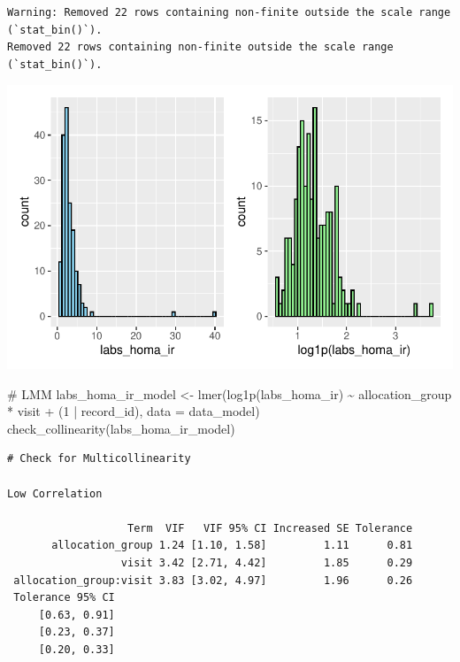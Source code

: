 \documentclass[
  letterpaper,
  DIV=11,
  numbers=noendperiod]{scrartcl}
\newenvironment{Shaded}{\begin{snugshade}}{\end{snugshade}}
\newcommand{\AttributeTok}[1]{\textcolor[rgb]{0.40,0.45,0.13}{#1}}
\newcommand{\CommentTok}[1]{\textcolor[rgb]{0.37,0.37,0.37}{#1}}
\newcommand{\DecValTok}[1]{\textcolor[rgb]{0.68,0.00,0.00}{#1}}
\newcommand{\FunctionTok}[1]{\textcolor[rgb]{0.28,0.35,0.67}{#1}}
\newcommand{\NormalTok}[1]{\textcolor[rgb]{0.00,0.23,0.31}{#1}}
\newcommand{\OtherTok}[1]{\textcolor[rgb]{0.00,0.23,0.31}{#1}}
\newcommand{\SpecialCharTok}[1]{\textcolor[rgb]{0.37,0.37,0.37}{#1}}
\begin{document}
\begin{verbatim}
Warning: Removed 22 rows containing non-finite outside the scale range (`stat_bin()`).
Removed 22 rows containing non-finite outside the scale range (`stat_bin()`).
\end{verbatim}

\includegraphics{Outcomes_V1V2V3_files/figure-pdf/labs_homa_ir_1-1.pdf}

\begin{Shaded}
\begin{Highlighting}[]
\CommentTok{\# LMM}
\NormalTok{labs\_homa\_ir\_model }\OtherTok{\textless{}{-}} \FunctionTok{lmer}\NormalTok{(}\FunctionTok{log1p}\NormalTok{(labs\_homa\_ir) }\SpecialCharTok{\textasciitilde{}}\NormalTok{ allocation\_group }\SpecialCharTok{*}\NormalTok{ visit }\SpecialCharTok{+}\NormalTok{ (}\DecValTok{1} \SpecialCharTok{|}\NormalTok{ record\_id), }\AttributeTok{data =}\NormalTok{ data\_model)}
\FunctionTok{check\_collinearity}\NormalTok{(labs\_homa\_ir\_model)}
\end{Highlighting}
\end{Shaded}

\begin{verbatim}
# Check for Multicollinearity

Low Correlation

                   Term  VIF   VIF 95% CI Increased SE Tolerance
       allocation_group 1.24 [1.10, 1.58]         1.11      0.81
                  visit 3.42 [2.71, 4.42]         1.85      0.29
 allocation_group:visit 3.83 [3.02, 4.97]         1.96      0.26
 Tolerance 95% CI
     [0.63, 0.91]
     [0.23, 0.37]
     [0.20, 0.33]
\end{verbatim}
\end{document}
